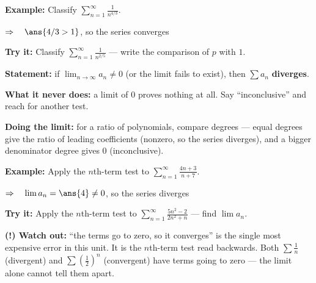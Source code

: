 \documentclass[12pt]{article}
\begin{document}
\begin{examplebox}
\textbf{Example:} \quad Classify $\displaystyle\sum_{n=1}^{\infty} \frac{1}{n^{4/3}}$.

$\Rightarrow\quad \ans{4/3 > 1}$, so the series converges
\end{examplebox}

\begin{tryitbox}
\textbf{Try it:} \quad Classify $\displaystyle\sum_{n=1}^{\infty} \frac{1}{n^{2/5}}$ ---
write the comparison of $p$ with $1$.\\[2pt]
\end{tryitbox}


\begin{formulabox}
\textbf{Statement:} if $\displaystyle\lim_{n \to \infty} a_n \neq 0$ (or the limit fails to
exist), then $\sum a_n$ \textbf{diverges}.\par
\smallskip
\textbf{What it never does:} a limit of $0$ proves nothing at all. Say ``inconclusive'' and
reach for another test.\par
\smallskip
\textbf{Doing the limit:} for a ratio of polynomials, compare degrees --- equal degrees give
the ratio of leading coefficients (nonzero, so the series diverges), and a bigger
denominator degree gives $0$ (inconclusive).
\end{formulabox}

\begin{examplebox}
\textbf{Example:} \quad Apply the $n$th-term test to
$\displaystyle\sum_{n=1}^{\infty} \frac{4n + 3}{n + 7}$.

$\Rightarrow\quad \lim a_n = \ans{4} \neq 0$, so the series diverges
\end{examplebox}

\begin{tryitbox}
\textbf{Try it:} \quad Apply the $n$th-term test to
$\displaystyle\sum_{n=1}^{\infty} \frac{5n^{2} - 2}{2n^{2} + n}$ --- find $\lim a_n$.\\[2pt]
\end{tryitbox}

\begin{watchoutbox}
\textbf{(!) Watch out:} ``the terms go to zero, so it converges'' is the single most
expensive error in this unit. It is the $n$th-term test read backwards. Both
$\sum \tfrac{1}{n}$ (divergent) and $\sum \left(\tfrac{1}{2}\right)^{n}$ (convergent) have
terms going to zero --- the limit alone cannot tell them apart.
\end{watchoutbox}
\end{document}
